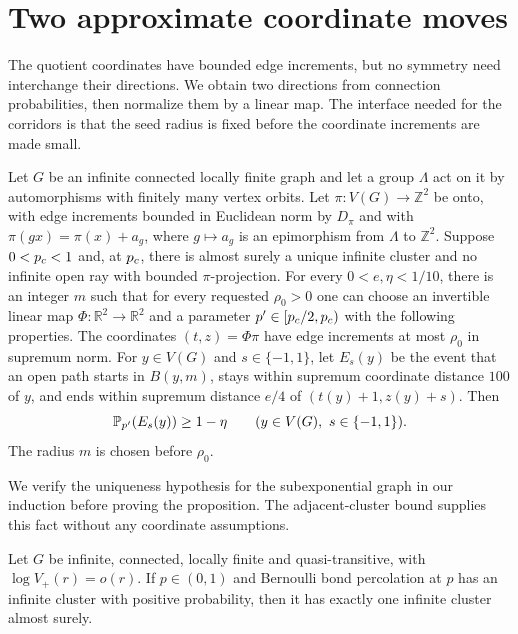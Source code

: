 \section{Two approximate coordinate moves}\label{sec:moves}

The quotient coordinates have bounded edge increments, but no symmetry
need interchange their directions. We obtain two directions from
connection probabilities, then normalize them by a linear map. The
interface needed for the corridors is that the seed radius is fixed
before the coordinate increments are made small.

\begin{proposition}\label{prop:moves}
Let $G$ be an infinite connected locally finite graph and let a group
$\Lambda$ act on it by automorphisms with finitely many vertex orbits.
Let $\pi:V(G)\to\mathbb Z^2$ be onto, with edge increments
bounded in Euclidean norm by $D_\pi$ and with
$\pi(gx)=\pi(x)+a_g$, where
$g\mapsto a_g$ is an epimorphism from $\Lambda$ to $\mathbb Z^2$.
Suppose $0<p_c<1$ and, at $p_c$, there is almost surely a unique
infinite cluster and no infinite open ray with bounded $\pi$-projection.
For every \(0<e,\eta<1/10\), there is an integer \(m\) such that
for every requested \(\rho_0>0\) one can choose an invertible linear map
\(\Phi:\mathbb R^2\to\mathbb R^2\) and a parameter
\(p'\in[p_c/2,p_c)\) with the following properties.
The coordinates \((t,z)=\Phi\pi\) have edge increments at most
\(\rho_0\) in supremum norm. For $y\in V(G)$ and
$s\in\{-1,1\}$, let $E_s(y)$ be the event that an open path starts
in $B(y,m)$, stays within supremum coordinate distance $100$ of $y$,
and ends within supremum distance $e/4$ of
$(t(y)+1,z(y)+s)$. Then
\[
 \mathbb P_{p'}(E_s(y))\ge1-\eta
 \qquad(y\in V(G),\ s\in\{-1,1\}).
\]
The radius $m$ is chosen before $\rho_0$.
\end{proposition}

We verify the uniqueness hypothesis for the subexponential graph in
our induction before proving the proposition. The adjacent-cluster
bound supplies this fact without any coordinate assumptions.

\begin{lemma}\label{lem:uniqueness}
Let $G$ be infinite, connected, locally finite and quasi-transitive, with
$\log V_+(r)=o(r)$. If $p\in(0,1)$ and Bernoulli bond percolation at $p$
has an infinite cluster with positive probability, then it has exactly
one infinite cluster almost surely.
\end{lemma}

